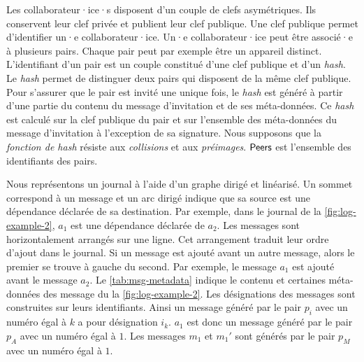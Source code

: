 Les collaborateur·ice·s disposent d'un couple de clefs asymétriques.
Ils conservent leur clef privée et publient leur clef publique.
Une clef publique permet d'identifier un·e collaborateur·ice.
Un·e collaborateur·ice peut être associé·e à plusieurs pairs.
Chaque pair peut par exemple être un appareil distinct.
L'identifiant d'un pair est un couple constitué d'une clef publique et d'un \emph{hash}.
Le \emph{hash} permet de distinguer deux pairs qui disposent de la même clef publique.
Pour s'assurer que le pair est invité une unique fois, le \emph{hash} est généré à partir d'une partie du contenu du message d'invitation et de ses méta-données.
Ce \emph{hash} est calculé sur la clef publique du pair et sur l'ensemble des méta-données du message d'invitation à l'exception de sa signature.
Nous supposons que la \emph{fonction de hash} résiste aux \emph{collisions} et aux \emph{préimages}.
$\operatorname{\mathsf{Peers}}$ est l'ensemble des identifiants des pairs.

Nous représentons un journal à l'aide d'un graphe dirigé et linéarisé.
Un sommet correspond à un message et un arc dirigé indique que sa source est une dépendance déclarée de sa destination.
Par exemple, dans le journal de la \autoref{fig:log-example-2}, $a_1$ est une dépendance déclarée de $a_2$.
Les messages sont horizontalement arrangés sur une ligne.
Cet arrangement traduit leur ordre d'ajout dans le journal.
Si un message est ajouté avant un autre message, alors le premier se trouve à gauche du second.
Par exemple, le message $a_1$ est ajouté avant le message $a_2$.
Le \autoref{tab:msg-metadata} indique le contenu et certaines méta-données des message du  la \autoref{fig:log-example-2}.
Les désignations des messages sont construites sur leurs identifiants.
Ainsi un message généré par le pair $p_i$ avec un numéro égal à $k$ a pour désignation $i_k$.
$a_1$ est donc un message généré par le pair $p_A$ avec un numéro égal à $1$.
Les messages $m_1$ et $m_1'$ sont générés par le pair $p_M$ avec un numéro égal à $1$.

